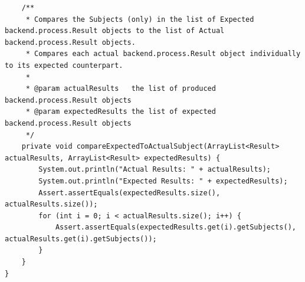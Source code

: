 \begin{lstlisting}
    /**
     * Compares the Subjects (only) in the list of Expected backend.process.Result objects to the list of Actual backend.process.Result objects.
     * Compares each actual backend.process.Result object individually to its expected counterpart.
     *
     * @param actualResults   the list of produced backend.process.Result objects
     * @param expectedResults the list of expected backend.process.Result objects
     */
    private void compareExpectedToActualSubject(ArrayList<Result> actualResults, ArrayList<Result> expectedResults) {
        System.out.println("Actual Results: " + actualResults);
        System.out.println("Expected Results: " + expectedResults);
        Assert.assertEquals(expectedResults.size(), actualResults.size());
        for (int i = 0; i < actualResults.size(); i++) {
            Assert.assertEquals(expectedResults.get(i).getSubjects(), actualResults.get(i).getSubjects());
        }
    }
}
\end{lstlisting}
